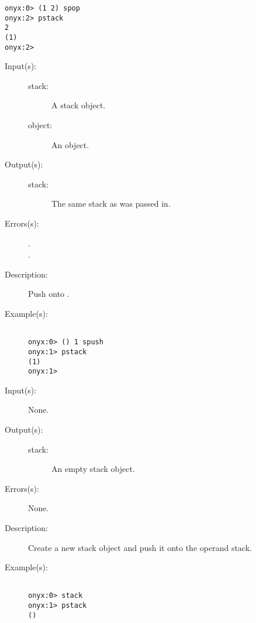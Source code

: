 \begin{description}
\begin{description}
\begin{verbatim}
onyx:0> (1 2) spop
onyx:2> pstack
2
(1)
onyx:2>
		\end{verbatim}
	\end{description}
\label{systemdict:spush}
\item[{\onyxop{stack object}{spush}{stack}}: ]
	\begin{description}\item[]
	\item[Input(s): ]
		\begin{description}\item[]
		\item[stack: ]
			A stack object.
		\item[object: ]
			An object.
		\end{description}
	\item[Output(s): ]
		\begin{description}\item[]
		\item[stack: ]
			The same stack as was passed in.
		\end{description}
	\item[Errors(s): ]
		\begin{description}\item[]
		\item[.]
		\item[.]
		\end{description}
	\item[Description: ]
		Push  onto .
	\item[Example(s): ]\begin{verbatim}

onyx:0> () 1 spush
onyx:1> pstack
(1)
onyx:1>
		\end{verbatim}
	\end{description}
\label{systemdict:stack}
\item[{\onyxop{--}{stack}{stack}}: ]
	\begin{description}\item[]
	\item[Input(s): ] None.
	\item[Output(s): ]
		\begin{description}\item[]
		\item[stack: ]
			An empty stack object.
		\end{description}
	\item[Errors(s): ] None.
	\item[Description: ]
		Create a new stack object and push it onto the operand stack.
	\item[Example(s): ]\begin{verbatim}

onyx:0> stack
onyx:1> pstack
()
		\end{verbatim}
	\end{description}
\end{description}

